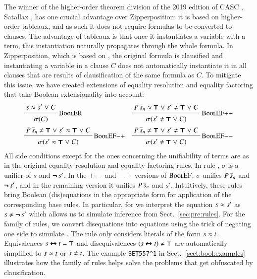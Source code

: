 The winner of the higher-order theorem division of the 2019 edition of CASC \cite{gs-19-casc27}, Satallax \cite{cb-12-satallax}, has one
crucial advantage over Zipperposition: it is based on higher-order
tableaux, and as such it does not require formulas to be converted to clauses. The advantage of tableaux is that once it instantiates a variable with a
term, this instantiation naturally propagates through the whole formula. In
Zipperposition, which is based on \lsup{}, the original formula
is clausified and instantiating a variable in a clause $C$ does not automatically instantiate
it in all clauses that are results of clausification of the same formula as $C$.
To mitigate this issue, we have created extensions of equality resolution and equality factoring
that take Boolean extensionality into account:
%
\begin{align*}
  & \namedinference{BoolER}
  { s \eq s' \llor C}
  {\sigmacl{C}}
  &&
  \namedinference{BoolEF$+-$}
  {P\,\tuplen{s} \eq \itrue \llor s' \not\eq \itrue \llor C}
  {\sigmacl{s' \not\eq \itrue \llor C}} \\
  & \namedinference{BoolEF$-+$}
  {P\,\tuplen{s} \not\eq \itrue \llor s' \eq \itrue \llor C}
  {\sigmacl{s' \eq \itrue \llor C}} &&
  \namedinference{BoolEF$-$$-$}
  {P\,\tuplen{s} \not\eq \itrue \llor s' \not\eq \itrue \llor C}
  {\sigmacl{s' \not\eq \itrue \llor C}}
\end{align*}
%
All side conditions except for the ones concerning the unifiability of terms are
as in the original equality resolution and equality factoring rules. In rule
, $\sigma$ is a unifier of $ s $ and $ \pmb{\neg\,} s' $. In the $+-$
and $-+$ versions of $\textsc{BoolEF}$, $\sigma$ unifies $ P \, \overline{s}_{n}
$ and $\pmb{\neg\,} s'$, and in the remaining version it unifies $ P \, \overline{s}_{n} $ and
$s'$. Intuitively, these rules bring Boolean (dis)equations in the appropriate
form for application of the corresponding base rules. In particular,
for  we interpret the equation $s \approx s'$ as $s \not\eq \inot s'$ which
allows us to simulate  inference from Sect.~\ref{sec:pre:rules}. 
For the  family of rules, we convert disequations into equations
using the trick of negating one side to simulate .
The rule  only considers literals of the form $s \approx t$. 
Equivalences $s \pmb{\leftrightarrow} t = \pmb{\top}$ and disequivalences $(s \iequiv t) \not\eq \itrue$ are automatically simplified to $s \approx t$ or $s \not\eq t$.
The example  \verb|SET557^1| in Sect.~\ref{sect:bool:examples} illustrates how 
the  family of rules helps solve the problems that get obfuscated by clausification.

